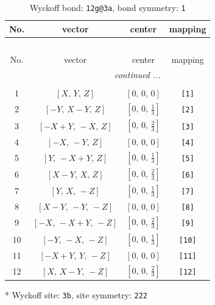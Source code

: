 \documentclass[fleqn,8pt]{jsarticle}
\begin{document}
\begin{longtable}{cccc}
\caption{Wyckoff bond: {\tt 12g@3a}, bond symmetry: {\tt 1}}
 \\
 \hline \hline
No. & vector & center & mapping \\ \hline \endfirsthead

\multicolumn{3}{l}{\tablename\ \thetable{}} \\
 \hline \hline
No. & vector & center & mapping \\ \hline \endhead

 \hline \hline
\multicolumn{3}{r}{\footnotesize\it continued ...} \\ \endfoot

 \hline \hline
\multicolumn{3}{r}{} \\ \endlastfoot

1 & $\left[ X,\, Y,\, Z \right]$ & $\left[ 0,\, 0,\, 0 \right]$ & {\tt [1]} \\ \hline
2 & $\left[ - Y,\, X - Y,\, Z \right]$ & $\left[ 0,\, 0,\, \frac{1}{3} \right]$ & {\tt [2]} \\ \hline
3 & $\left[ - X + Y,\, - X,\, Z \right]$ & $\left[ 0,\, 0,\, \frac{2}{3} \right]$ & {\tt [3]} \\ \hline
4 & $\left[ - X,\, - Y,\, Z \right]$ & $\left[ 0,\, 0,\, 0 \right]$ & {\tt [4]} \\ \hline
5 & $\left[ Y,\, - X + Y,\, Z \right]$ & $\left[ 0,\, 0,\, \frac{1}{3} \right]$ & {\tt [5]} \\ \hline
6 & $\left[ X - Y,\, X,\, Z \right]$ & $\left[ 0,\, 0,\, \frac{2}{3} \right]$ & {\tt [6]} \\ \hline
7 & $\left[ Y,\, X,\, - Z \right]$ & $\left[ 0,\, 0,\, \frac{1}{3} \right]$ & {\tt [7]} \\ \hline
8 & $\left[ X - Y,\, - Y,\, - Z \right]$ & $\left[ 0,\, 0,\, 0 \right]$ & {\tt [8]} \\ \hline
9 & $\left[ - X,\, - X + Y,\, - Z \right]$ & $\left[ 0,\, 0,\, \frac{2}{3} \right]$ & {\tt [9]} \\ \hline
10 & $\left[ - Y,\, - X,\, - Z \right]$ & $\left[ 0,\, 0,\, \frac{1}{3} \right]$ & {\tt [10]} \\ \hline
11 & $\left[ - X + Y,\, Y,\, - Z \right]$ & $\left[ 0,\, 0,\, 0 \right]$ & {\tt [11]} \\ \hline
12 & $\left[ X,\, X - Y,\, - Z \right]$ & $\left[ 0,\, 0,\, \frac{2}{3} \right]$ & {\tt [12]} \\
\end{longtable}
* Wyckoff site: {\tt 3b}, site symmetry: {\tt 222}
\end{document}
